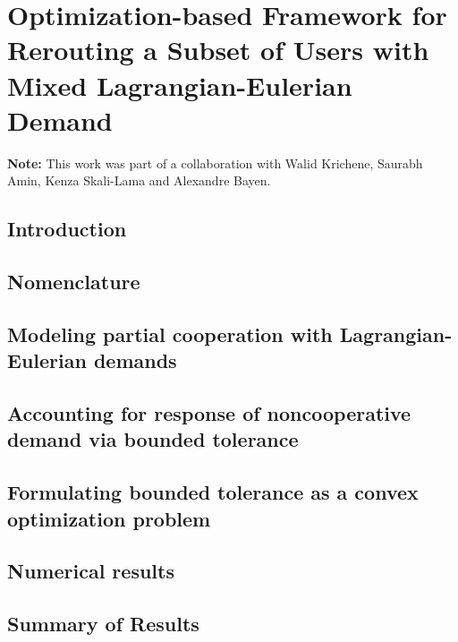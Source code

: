 \chapter{Optimization-based Framework for Rerouting a Subset of Users with Mixed Lagrangian-Eulerian Demand}
\label{chapter:le}

\textbf{Note: } This work was part of a collaboration with Walid Krichene, Saurabh Amin, Kenza Skali-Lama and Alexandre Bayen. 

\section{Introduction}
\label{sec:le:introduction}



\section*{Nomenclature}
\label{sec:le:Nomenclature}




\section{Modeling partial cooperation with Lagrangian-Eulerian demands}
\label{sec:le:Modeling-Partial-Participance}




\section{Accounting for response of noncooperative demand via bounded tolerance}
\label{sec:le:Accounting-for-Response}




\section{Formulating bounded tolerance as a convex optimization problem\label{sec:le:Convex-Optimization-Program}}




\section{Numerical results}
\label{sec:le:Numerical-Results}




\section{Summary of Results}
\label{sec:le:Conclusion}

